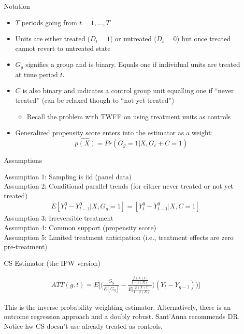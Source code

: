 \documentclass{beamer}
\begin{document}
\begin{frame}{Notation}

\begin{itemize}
\item $T$ periods going from $t=1, \dots, T$
\item Units are either treated ($D_t=1$) or untreated ($D_t=0$) but once treated cannot revert to untreated state
\item $G_g$ signifies a group and is binary.  Equals one if individual units are treated at time period $t$.
\item $C$ is also binary and indicates a control group unit equalling one if ``never treated'' (can be relaxed though to ``not yet treated'')
	\begin{itemize}
	\item Recall the problem with TWFE on using treatment units as controls
	\end{itemize}
\item Generalized propensity score enters into the estimator as a weight: $$\widehat{p(X)} = Pr(G_g=1 | X,G_c+C=1)$$
\end{itemize}

\end{frame}

\begin{frame}{Assumptions}

Assumption 1: Sampling is iid (panel data) \\
\bigskip
Assumption 2: Conditional parallel trends (for either never treated or not yet treated) \\
\begin{eqnarray*}
E[Y_t^0 - Y_{t-1}^0 | X,G_g=1] = [Y_t^0 - Y_{t-1}^0 | X,C=1] 
\end{eqnarray*}
\bigskip
Assumption 3: Irreversible treatment \\
Assumption 4: Common support (propensity score) \\
\bigskip
Assumption 5: Limited treatment anticipation (i.e., treatment effects are zero pre-treatment)

\end{frame}

\begin{frame}{CS Estimator (the IPW version)}

\begin{eqnarray*}
ATT(g,t) = E \bigg [ \bigg ( \frac{G_g}{E[G_g]} - \frac{ \frac{\hat{p}(X)C}{1-\hat{p}(X)}}{E \bigg [ \frac{\hat{p}(X)C}{1-\hat{p}(X)} \bigg ]} \bigg ) (Y_t - Y_{g-1} ) \bigg ) \bigg ]
\end{eqnarray*}

This is the inverse probability weighting estimator.  Alternatively, there is an outcome regression approach and a doubly robust. Sant'Anna recommends DR. Notice hw CS doesn't use already-treated as controls.
\end{frame}
\end{document}
